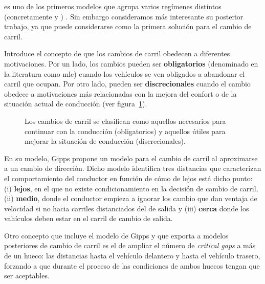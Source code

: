  es uno de los primeros modelos que agrupa varios regímenes distintos (concretamente \textit{} y \textit{}) \cite{Gipps1981}. Sin embargo consideramos más interesante su posterior trabajo, \cite{Gipps1986} ya que puede considerarse como la primera solución para el cambio de carril.

Introduce el concepto de que los cambios de carril obedecen a diferentes motivaciones. Por un lado, los cambios pueden ser \textbf{obligatorios} (denominado en la literatura como \gls{mlc}) cuando los vehículos se ven obligados a abandonar el carril que ocupan. Por otro lado, pueden ser \textbf{discrecionales} cuando el cambio obedece a motivaciones más relacionadas con la mejora del confort o de la situación actual de conducción (ver figura~\ref{fig:lane-change-mandatory-vs-discretional}).

\begin{figure}[t]
	\caption[Ejemplo de cambio de carril obligatorio frente a cambio de carril discrecional]{Los cambios de carril se clasifican como aquellos necesarios para continuar con la conducción (obligatorios) y aquellos útiles para mejorar la situación de conducción (discrecionales).}
	\label{fig:lane-change-mandatory-vs-discretional}
\end{figure}

En su modelo, Gipps propone un modelo para el cambio de carril al aproximarse a un cambio de dirección. Dicho modelo identifica tres distancias que caracterizan el comportamiento del conductor en función de cómo de lejos está dicho punto: (i) \textbf{lejos}, en el que no existe condicionamiento en la decisión de cambio de carril, (ii) \textbf{medio}, donde el conductor empieza a ignorar los cambio que dan ventaja de velocidad si no hacia carriles distanciados del de salida y (iii) \textbf{cerca} donde los vahículos deben estar en el carril de cambio de salida.

Otro concepto que incluye el modelo de Gipps y que exporta a modelos posteriores de cambio de carril es el de ampliar el número de \textit{critical gaps} a más de un hueco: las distancias hasta el vehículo delantero y hasta el vehículo trasero, forzando a que durante el proceso de \textit{} las condiciones de ambos huecos tengan que ser aceptables.

